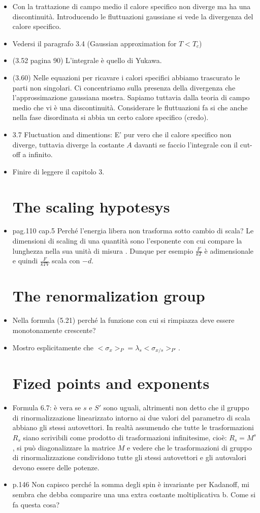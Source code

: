 \documentclass[10pt,a4paper]{article}
\begin{document}
\begin{itemize}
\item Con la trattazione di campo medio il calore specifico non diverge ma ha una discontinuità. Introducendo le fluttuazioni gaussiane si vede la divergenza del calore specifico.
\item Vedersi il paragrafo 3.4 (Gaussian approximation for $T<T_c$)
\item (3.52 pagina 90) L'integrale è quello di Yukawa.
\item (3.60) Nelle equazioni per ricavare i calori specifici abbiamo trascurato le parti non singolari. Ci concentriamo sulla presenza della divergenza che l'approssimazione gaussiana mostra. Sapiamo tuttavia dalla teoria di campo medio che  vi è una discontinuità. Considerare le fluttuazioni fa si che anche nella fase disordinata si abbia un certo calore specifico (credo).
\item 3.7 Fluctuation and dimentions: E' pur vero che il calore specifico non diverge, tuttavia diverge la costante $A$ davanti se faccio l'integrale con il cut-off a infinito.
\item Finire di leggere il capitolo 3.

\section{The scaling hypotesys}
\item pag.110 cap.5 Perché l'energia libera non trasforma sotto cambio di scala? Le dimensioni di scaling di una quantità sono l'esponente con cui compare la lunghezza nella sua unità di misura . Dunque per esempio $\frac{F}{kT}$ è adimensionale e quindi $\frac{F}{kTV}$ scala con $-d$.

\section{The renormalization group}
\item Nella formula (5.21) perché la funzione con cui si rimpiazza deve essere monotonamente crescente?
\item Mostro esplicitamente che $<\sigma_x>_P = \lambda_s <\sigma_{x/s}>_{P'}$.
\section{Fized points and exponents}
\item Formula 6.7: è vera se $s$ e $S'$ sono uguali, altrimenti non  detto che il gruppo di rinormalizzazione linearizzato intorno ai due valori del parametro di scala abbiano gli stessi autovettori.
\Item In realtà assumendo che tutte le trasformazioni $R_s$ siano scrivibili come prodotto di trasformazioni infinitesime, cioè: $R_s = M^s$, si può diagonalizzare la matrice $M$ e vedere che le trasformazioni di gruppo di rinormalizzazione condividono tutte gli stessi autovettori e gli autovalori devono essere delle potenze.
\item p.146 Non capisco perché la somma degli spin è invariante per Kadanoff, mi sembra che debba comparire una una extra costante moltiplicativa b. Come si fa questa cosa?  
\end{itemize}
\end{document}
